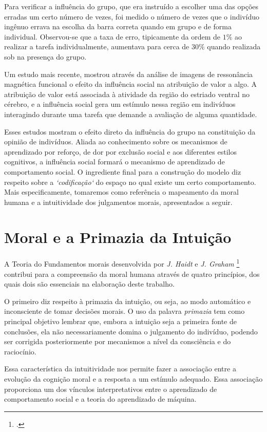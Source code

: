 Para verificar a influência do grupo, que era instruído a escolher uma das opções erradas um certo número de vezes, foi medido o número de vezes que o indivíduo ingênuo errava na escolha da barra correta quando em grupo e de forma individual.
Observou-se que a taxa de erro, tipicamente da ordem de $1\%$ ao realizar a tarefa individualmente, aumentava para cerca de $30\%$ quando realizada sob na presença do grupo.

Um estudo mais recente, \parencite{Campbell-Meiklejohn2010} mostrou através da análise de imagens de ressonância magnética funcional o efeito da influência social na atribuição de valor a algo.
A atribuição de valor está associada à atividade da região do estriado ventral no cérebro, e a influência social gera um estímulo nessa região em indivíduos interagindo durante uma tarefa que demande a avaliação de alguma quantidade.

Esses estudos mostram o efeito direto da influência do grupo na constituição da opinião de indivíduos.
Aliada ao conhecimento sobre os mecanismos de aprendizado por reforço, de dor por exclusão social e aos diferentes estilos cognitivos, a influência social formará o mecanismo de aprendizado de comportamento social.
O ingrediente final para a construção do modelo diz respeito sobre a \emph{`codificação`} do espaço no qual existe um certo comportamento.
Mais especificamente, tomaremos como referência o mapeamento da moral humana e a intuitividade dos julgamentos morais, apresentados a seguir.

\section{Moral e a Primazia da Intuição}

A Teoria do Fundamentos morais desenvolvida por \emph{J. Haidt} e \emph{J. Graham} \footcite{Haidt2007, Graham2011} contribui para a compreensão da moral humana através de quatro princípios, dos quais dois são essenciais na elaboração deste trabalho.

O primeiro diz respeito à primazia da intuição, ou seja, ao modo automático e inconsciente de tomar decisões morais.
O uso da palavra \emph{primazia} tem como principal objetivo lembrar que, embora a intuição seja a primeira fonte de conclusões, ela não necessariamente domina o julgamento do indivíduo, podendo ser corrigida posteriormente por mecanismos a nível da consciência e do raciocínio.

Essa característica da intuitividade nos permite fazer a associação entre a evolução da cognição moral e a resposta a um estímulo adequado.
Essa associação proporciona um dos vínculos interpretativos entre o aprendizado de comportamento social e a teoria do aprendizado de máquina.

